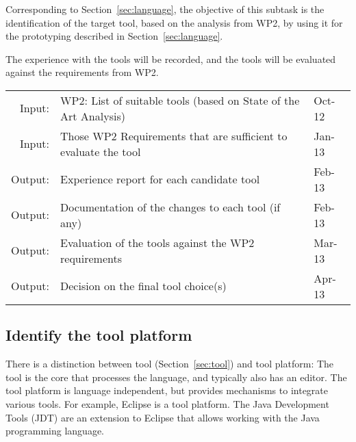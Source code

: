 \documentclass[11pt, a4paper]{article}
\let\oldmarginpar\marginpar
\renewcommand\marginpar[1]{\-\oldmarginpar[\raggedleft\scriptsize #1]%
{\raggedright\scriptsize #1}}
\newenvironment{inoutput}
{\vspace{2mm}
\noindent
\begin{tabular}{|r|p{.7\linewidth}|l|}
\hline}
{
\hline
\end{tabular}}
\begin{document}
Corresponding to Section~\ref{sec:language}, the objective of this subtask is the identification of the target tool, based on the analysis from WP2, by using it for the prototyping described in Section~\ref{sec:language}.

The experience with the tools will be recorded, and the tools will be evaluated against the requirements from WP2.

\begin{inoutput}
Input: & WP2: List of suitable tools (based on State of the Art Analysis) & Oct-12 \\
Input: & Those WP2 Requirements that are sufficient to evaluate the tool & Jan-13 \\
\hline
Output: & Experience report for each candidate tool & Feb-13 \\
Output: & Documentation of the changes to each tool (if any) & Feb-13 \\
Output: & Evaluation of the tools against the WP2 requirements & Mar-13 \\
Output: & Decision on the final tool choice(s) & Apr-13 \\
\end{inoutput}

\subsection{Identify the tool platform}
\label{sec:tool_platform}

There is a distinction between tool (Section~\ref{sec:tool}) and tool platform: The tool is the core that processes the language, and typically also has an editor. The tool platform is language independent, but provides mechanisms to integrate various tools. For example, Eclipse is a tool platform. The Java Development Tools (JDT) are an extension to Eclipse that allows working with the Java programming language.
\end{document}
